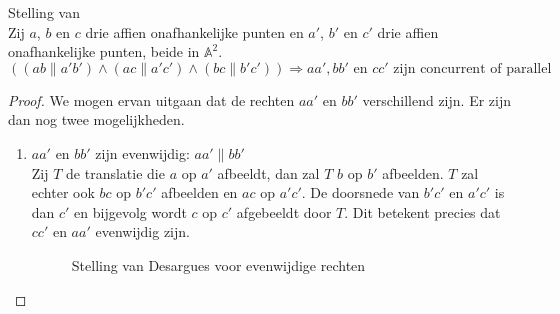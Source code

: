 \documentclass[main.tex]{subfiles}
\begin{document}
\begin{st}
  Stelling van \\
  Zij $a$, $b$ en $c$ drie affien onafhankelijke punten en $a'$, $b'$ en $c'$ drie affien onafhankelijke punten, beide in $\mathbb{A}^{2}$.
  \[  ((ab \parallel a'b') \wedge (ac \parallel a'c') \wedge (bc \parallel b'c')) \Rightarrow aa', bb' \text{ en } cc' \text{ zijn concurrent of parallel }\]
  
  \begin{proof}
    We mogen ervan uitgaan dat de rechten $aa'$ en $bb'$ verschillend zijn.
    Er zijn dan nog twee mogelijkheden.
    \begin{enumerate}
    \item $aa'$ en $bb'$ zijn evenwijdig: $aa' \parallel bb'$\\
      Zij $T$ de translatie die $a$ op $a'$ afbeeldt, dan zal $T$ $b$ op $b'$ afbeelden.
      $T$ zal echter ook $bc$ op $b'c'$ afbeelden en $ac$ op $a'c'$.
      De doorsnede van $b'c'$ en $a'c'$ is dan $c'$ en bijgevolg wordt $c$ op $c'$ afgebeeldt door $T$.
      Dit betekent precies dat $cc'$ en $aa'$ evenwijdig zijn.
      \begin{figure}[H]
        \centering
        \caption{Stelling van Desargues  voor evenwijdige rechten}
        \label{fig:stelling-van-desargues}
      \end{figure}


\end{enumerate}
\end{proof}
\end{st}
\end{document}
